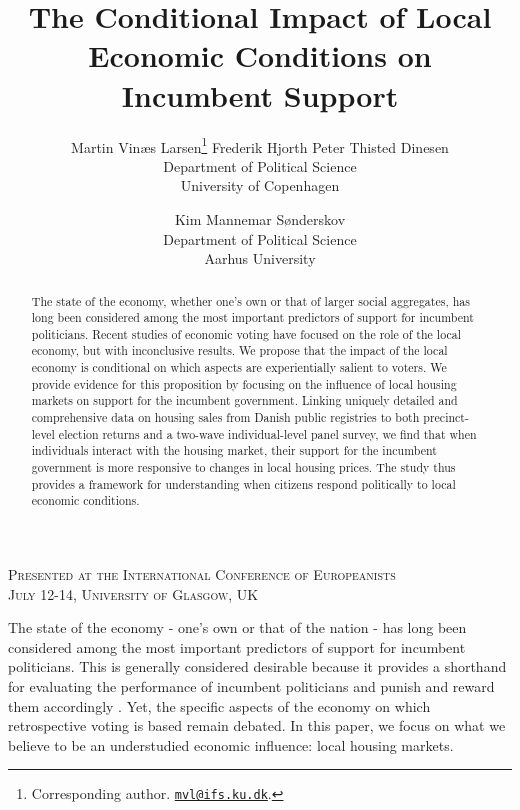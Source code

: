 \documentclass[12pt,a4paper]{article}
\title{\textbf{The Conditional Impact of Local Economic Conditions on Incumbent Support}}
\author{Martin Vinæs Larsen\thanks{Corresponding author. \href{mailto:mvl@ifs.ku.dk}{\texttt{mvl@ifs.ku.dk}}. } \qquad Frederik Hjorth \qquad Peter Thisted  Dinesen \\Department of Political Science \\ University of Copenhagen \and Kim Mannemar  Sønderskov  \\Department of Political Science \\ Aarhus University   }
\begin{document}
	
	\maketitle
	
	\begin{center}
		\textsc{Presented at the International Conference of Europeanists \\
			July 12-14, University of Glasgow, UK }
	\end{center}
	
	\begin{abstract} The state of the economy, whether one’s own or that of larger social aggregates, has long been considered among the most important predictors of support for incumbent politicians. Recent studies of economic voting have focused on the role of the local economy, but with inconclusive results. We propose that the impact of the local economy is conditional on which aspects are experientially salient to voters. We provide evidence for this proposition by focusing on the influence of local housing markets on support for the incumbent government. Linking uniquely detailed and comprehensive data on housing sales from Danish public registries to both precinct-level election returns and a two-wave individual-level panel survey, we find that when individuals interact with the housing market, their support for the incumbent government is more responsive to changes in local housing prices. The study thus provides a framework for understanding when citizens respond politically to local economic conditions.
		
	\end{abstract}
	
	
	
	\newpage
	
	\onehalfspacing
	The state of the economy - one’s own or that of the nation - has long been considered among the most important predictors of support for incumbent politicians. This is generally considered desirable because it provides a shorthand for evaluating the performance of incumbent politicians and punish and reward them accordingly \citep{ashworth2012electoral,healy2013retrospective}. Yet, the specific aspects of the economy on which retrospective voting is based remain debated. In this paper, we focus on what we believe to be an understudied economic influence: local housing markets.
	
\end{document}
